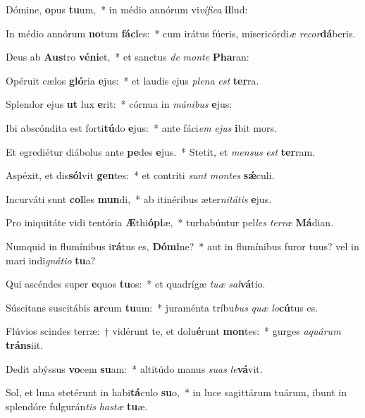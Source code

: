 \item Dómine, \textbf{o}pus \textbf{tu}um,~* in médio annórum vi\textit{ví}\textit{fi}\textit{ca} \textbf{il}lud:
\item In médio annórum \textbf{no}tum \textbf{fá}\textbf{ci}es:~* cum irátus fúeris, misericórdi\textit{æ} \textit{re}\textit{cor}\textbf{dá}beris.
\item Deus ab \textbf{Aus}tro \textbf{vé}\textbf{ni}et,~* et sanctus \textit{de} \textit{mon}\textit{te} \textbf{Pha}ran:
\item Opéruit cælos \textbf{gló}ria \textbf{e}jus:~* et laudis ejus \textit{ple}\textit{na} \textit{est} \textbf{ter}ra.
\item Splendor ejus \textbf{ut} lux \textbf{e}rit:~* córnua in \textit{má}\textit{ni}\textit{bus} \textbf{e}jus:
\item Ibi abscóndita est forti\textbf{tú}do \textbf{e}jus:~* ante fáci\textit{em} \textit{e}\textit{jus} \textbf{i}bit mors.
\item Et egrediétur diábolus ante \textbf{pe}des \textbf{e}jus.~* Stetit, et \textit{men}\textit{sus} \textit{est} \textbf{ter}ram.
\item Aspéxit, et dis\textbf{sól}vit \textbf{gen}tes:~* et contríti \textit{sunt} \textit{mon}\textit{tes} \textbf{sǽ}culi.
\item Incurváti sunt \textbf{col}les \textbf{mun}di,~* ab itinéribus æter\textit{ni}\textit{tá}\textit{tis} \textbf{e}jus.
\item Pro iniquitáte vidi tentória \textbf{Æ}thi\textbf{ó}\textbf{pi}æ,~* turbabúntur pel\textit{les} \textit{ter}\textit{ræ} \textbf{Má}dian.
\item Numquid in flumínibus i\textbf{rá}tus es, \textbf{Dó}\textbf{mi}ne?~* aut in flumínibus furor tuus? vel in mari indi\textit{gná}\textit{ti}\textit{o} \textbf{tu}a?
\item Qui ascéndes super \textbf{e}quos \textbf{tu}os:~* et quadrígæ \textit{tu}\textit{æ} \textit{sal}\textbf{vá}tio.
\item Súscitans suscitábis \textbf{ar}cum \textbf{tu}um:~* juraménta tríbu\textit{bus} \textit{quæ} \textit{lo}\textbf{cú}tus es.
\item Flúvios scindes terræ:~† vidérunt te, et dolu\textbf{é}runt \textbf{mon}tes:~* gurges \textit{a}\textit{quá}\textit{rum} \textbf{tráns}iit.
\item Dedit abýssus \textbf{vo}cem \textbf{su}am:~* altitúdo manus \textit{su}\textit{as} \textit{le}\textbf{vá}vit.
\item Sol, et luna stetérunt in habi\textbf{tá}culo \textbf{su}o,~* in luce sagittárum tuárum, ibunt in splendóre fulgurán\textit{tis} \textit{has}\textit{tæ} \textbf{tu}æ.
